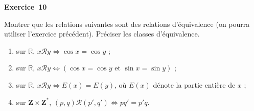 \documentclass[11pt,a4paper]{article}
\begin{document}
	\medskip\noindent\textbf{\Large\color{bleu}Exercice~10}\nopagebreak
	\begin{enonce}
		Montrer que les relations suivantes sont des relations d'équivalence (on pourra utiliser l'exercice précédent). Préciser les classes d'équivalence.
		\begin{enumerate}
			\item[a)] sur $\mathbb{R}$, $x\mathcal{R}y \iff \cos x = \cos y$ ;
			\item[b)] sur $\mathbb{R}$, $x\mathcal{R}y \iff (\cos x = \cos y \text{ et } \sin x = \sin y)$ ;
			\item[c)] sur $\mathbb{R}$, $x\mathcal{R}y \iff E(x) = E(y)$, où $E(x)$ dénote la partie entière de $x$ ;
			\item[d)] sur $\mathbf{Z} \times \mathbf{Z}^*$, $(p,q)\mathcal{R}(p',q') \iff pq' = p'q$.
		\end{enumerate}
	\end{enonce}
\end{document}
